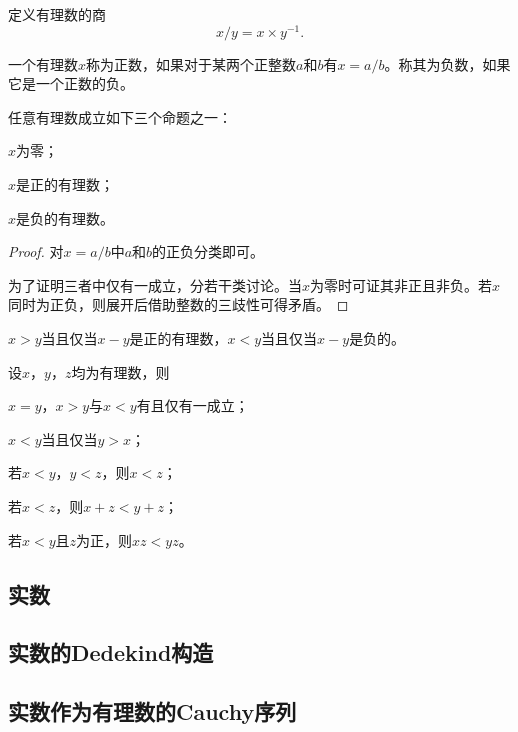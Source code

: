 \documentclass{ctexrep}
\begin{document}
  \begin{definition}
    定义有理数的商
    \[ x/y=x\times y^{-1}. \]
  \end{definition}
  \begin{definition}
    一个有理数$x$称为正数，如果对于某两个正整数$a$和$b$有$x=a/b$。称其为负数，如果它是一个正数的负。
  \end{definition}
  \begin{theorem}
    任意有理数成立如下三个命题之一：
    \begin{aenum}
      \item $x$为零；
      \item $x$是正的有理数；
      \item $x$是负的有理数。
    \end{aenum}
  \end{theorem}
  \begin{proof}
    对$x=a/b$中$a$和$b$的正负分类即可。
    \par
    为了证明三者中仅有一成立，分若干类讨论。当$x$为零时可证其非正且非负。若$x$同时为正负，则展开后借助整数的三歧性可得矛盾。
  \end{proof}
  \begin{definition}
    $x>y$当且仅当$x-y$是正的有理数，$x<y$当且仅当$x-y$是负的。
  \end{definition}
  \begin{theorem}
    设$x$，$y$，$z$均为有理数，则
    \begin{aenum}
      \item $x=y$，$x>y$与$x<y$有且仅有一成立；
      \item $x<y$当且仅当$y>x$；
      \item 若$x<y$，$y<z$，则$x<z$；
      \item 若$x<z$，则$x+z<y+z$；
      \item 若$x<y$且$z$为正，则$xz<yz$。
    \end{aenum}
  \end{theorem}
  \subsection{实数}
  \subsection{实数的Dedekind构造}
  \subsection{实数作为有理数的Cauchy序列}
\end{document}
